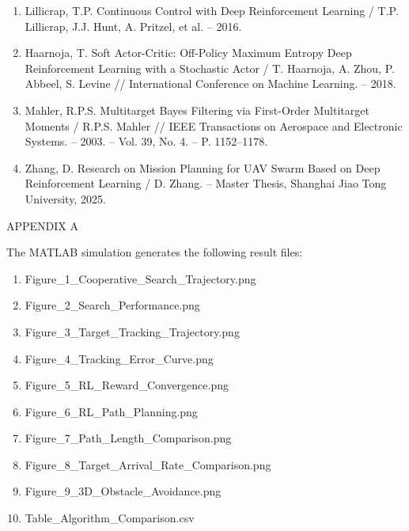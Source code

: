 \documentclass[14pt,a4paper]{extarticle}
\newcommand{\StartAppendixA}{%
  \clearpage
  \appendix
  \setcounter{figure}{0}
  \setcounter{table}{0}
  \setcounter{equation}{0}
  \renewcommand{\thefigure}{A.\arabic{figure}}
  \renewcommand{\thetable}{A.\arabic{table}}
  \renewcommand{\theequation}{A.\arabic{equation}}
}
\begin{document}
\begin{enumerate}[label=\arabic*., leftmargin=1.25cm]
  \item Lillicrap, T.P. Continuous Control with Deep Reinforcement Learning / T.P. Lillicrap, J.J. Hunt, A. Pritzel, et al. -- 2016.

  \item Haarnoja, T. Soft Actor-Critic: Off-Policy Maximum Entropy Deep Reinforcement Learning with a Stochastic Actor / T. Haarnoja, A. Zhou, P. Abbeel, S. Levine // International Conference on Machine Learning. -- 2018.

  \item Mahler, R.P.S. Multitarget Bayes Filtering via First-Order Multitarget Moments / R.P.S. Mahler // IEEE Transactions on Aerospace and Electronic Systems. -- 2003. -- Vol. 39, No. 4. -- P. 1152--1178.

  \item Zhang, D. Research on Mission Planning for UAV Swarm Based on Deep Reinforcement Learning / D. Zhang. -- Master Thesis, Shanghai Jiao Tong University, 2025.
\end{enumerate}

\StartAppendixA

{}
\begin{center}
  \normalfont\normalsize APPENDIX A
\end{center}

\vspace{1.5\baselineskip}



\vspace{1.5\baselineskip}

The MATLAB simulation generates the following result files:

\begin{enumerate}[label=\arabic*.]
  \item Figure\_1\_Cooperative\_Search\_Trajectory.png
  \item Figure\_2\_Search\_Performance.png
  \item Figure\_3\_Target\_Tracking\_Trajectory.png
  \item Figure\_4\_Tracking\_Error\_Curve.png
  \item Figure\_5\_RL\_Reward\_Convergence.png
  \item Figure\_6\_RL\_Path\_Planning.png
  \item Figure\_7\_Path\_Length\_Comparison.png
  \item Figure\_8\_Target\_Arrival\_Rate\_Comparison.png
  \item Figure\_9\_3D\_Obstacle\_Avoidance.png
  \item Table\_Algorithm\_Comparison.csv
\end{enumerate}
\end{document}
